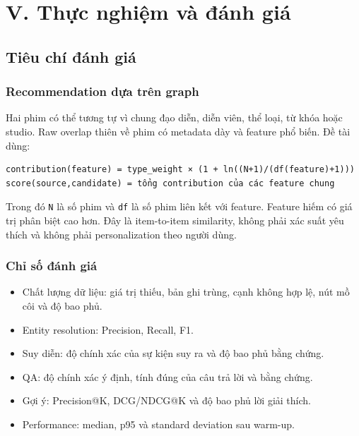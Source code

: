 \chapter{V. Thực nghiệm và đánh giá}

\section{Tiêu chí đánh giá}

\subsection{Recommendation dựa trên graph}

Hai phim có thể tương tự vì chung đạo diễn, diễn viên, thể loại, từ khóa hoặc
studio. Raw overlap thiên về phim có metadata dày và feature phổ biến. Đề tài dùng:

\begin{Verbatim}[fontsize=\scriptsize,frame=single]
contribution(feature) = type_weight × (1 + ln((N+1)/(df(feature)+1)))
score(source,candidate) = tổng contribution của các feature chung
\end{Verbatim}

Trong đó \texttt{N} là số phim và \texttt{df} là số phim liên kết với feature. Feature hiếm có
giá trị phân biệt cao hơn. Đây là item-to-item similarity, không phải xác suất
yêu thích và không phải personalization theo người dùng.

\subsection{Chỉ số đánh giá}

\begin{itemize}
\item Chất lượng dữ liệu: giá trị thiếu, bản ghi trùng, cạnh không hợp lệ, nút mồ côi và độ bao phủ.
\item Entity resolution: Precision, Recall, F1.
\item Suy diễn: độ chính xác của sự kiện suy ra và độ bao phủ bằng chứng.
\item QA: độ chính xác ý định, tính đúng của câu trả lời và bằng chứng.
\item Gợi ý: Precision@K, DCG/NDCG@K và độ bao phủ lời giải thích.
\item Performance: median, p95 và standard deviation sau warm-up.
\end{itemize}

